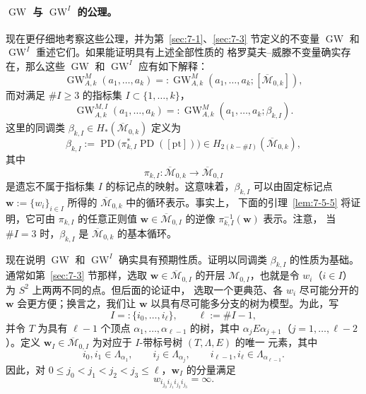 \paragraph{$\operatorname{GW}$ 与 $\operatorname{GW}^I$ 的公理。}
现在更仔细地考察这些公理，并为第~\ref{sec:7-1}、\ref{sec:7-3} 节定义的不变量
$\operatorname{GW}$ 和 $\operatorname{GW}^I$ 重述它们。如果能证明具有上述全部性质的
格罗莫夫--威滕不变量确实存在，那么这些 $\operatorname{GW}$ 和
$\operatorname{GW}^I$ 应有如下解释：
\[
  \operatorname{GW}_{A,k}^M(a_1,\ldots,a_k)
  =:\operatorname{GW}_{A,k}^M
     (a_1,\ldots,a_k;[\overline{\mathcal M}_{0,k}]),
\]
而对满足 $\#I\ge3$ 的指标集 $I\subset\{1,\ldots,k\}$，
\[
  \operatorname{GW}_{A,k}^{M,I}(a_1,\ldots,a_k)
  =:\operatorname{GW}_{A,k}^M(a_1,\ldots,a_k;\beta_{k,I}).
\]
这里的同调类
$\beta_{k,I}\in H_*(\overline{\mathcal M}_{0,k})$ 定义为
\[
  \beta_{k,I}
  :=\operatorname{PD}\bigl(
    \pi_{k,I}^*\operatorname{PD}([\mathrm{pt}])\bigr)
  \in H_{2(k-\#I)}(\overline{\mathcal M}_{0,k}),
\]
其中
\[
  \pi_{k,I}:\overline{\mathcal M}_{0,k}
  \longrightarrow\overline{\mathcal M}_{0,I}
\]
是遗忘不属于指标集 $I$ 的标记点的映射。这意味着，$\beta_{k,I}$ 可以由固定标记点
$\mathbf w:=\{w_i\}_{i\in I}$ 所得的 $\overline{\mathcal M}_{0,k}$ 中的循环表示。事实上，
下面的引理~\ref{lem:7-5-5} 将证明，它可由 $\pi_{k,I}$ 的任意正则值
$\mathbf w\in\overline{\mathcal M}_{0,I}$ 的逆像 $\pi_{k,I}^{-1}(\mathbf w)$ 表示。注意，
当 $\#I=3$ 时，$\beta_{k,I}$ 是 $\overline{\mathcal M}_{0,k}$ 的基本循环。

现在说明 $\operatorname{GW}$ 和 $\operatorname{GW}^I$ 确实具有预期性质。证明以同调类
$\beta_{k,I}$ 的性质为基础。通常如第~\ref{sec:7-3} 节那样，选取
$\mathbf w\in\overline{\mathcal M}_{0,I}$ 的开层
$\mathcal M_{0,I}$，也就是令 $w_i$（$i\in I$）为 $S^2$ 上两两不同的点。但后面的论证中，
选取一个更典范、各 $w_i$ 尽可能分开的 $\mathbf w$ 会更方便；换言之，我们让
$\mathbf w$ 以具有尽可能多分支的树为模型。为此，写
\[
  I=:\{i_0,\ldots,i_\ell\},
  \qquad \ell:=\#I-1,
\]
并令 $T$ 为具有 $\ell-1$ 个顶点
$\alpha_1,\ldots,\alpha_{\ell-1}$ 的树，其中
$\alpha_jE\alpha_{j+1}$（$j=1,\ldots,\ell-2$）。定义
$\mathbf w_I\in\overline{\mathcal M}_{0,I}$ 为对应于 $I$-带标号树 $(T,\Lambda,E)$ 的唯一
元素，其中
\begin{equation}\label{eq:7-5-1}
  i_0,i_1\in\Lambda_{\alpha_1},\qquad
  i_j\in\Lambda_{\alpha_j},\qquad
  i_{\ell-1},i_\ell\in\Lambda_{\alpha_{\ell-1}}.
\end{equation}
因此，对 $0\le j_0<j_1<j_2<j_3\le\ell$，$\mathbf w_I$ 的分量满足
\[
  w_{i_{j_0}i_{j_1}i_{j_2}i_{j_3}}=\infty.
\]

